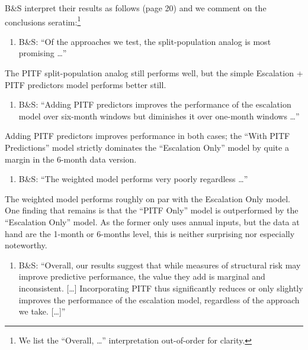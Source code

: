 \documentclass[
]{article}
\providecommand{\tightlist}{%
  \setlength{\itemsep}{0pt}\setlength{\parskip}{0pt}}
\begin{document}
B\&S interpret their results as follows (page 20) and we comment on the conclusions seratim:\footnote{We list the ``Overall, \ldots{}'' interpretation out-of-order for clarity.}

\begin{enumerate}
\def\labelenumi{\arabic{enumi}.}
\tightlist
\item
  B\&S: ``Of the approaches we test, the split-population analog is most promising \ldots{}''
\end{enumerate}

The PITF split-population analog still performs well, but the simple Escalation + PITF predictors model performs better still.

\begin{enumerate}
\def\labelenumi{\arabic{enumi}.}
\setcounter{enumi}{1}
\tightlist
\item
  B\&S: ``Adding PITF predictors improves the performance of the escalation model over six-month windows but diminishes it over one-month windows \ldots ''
\end{enumerate}

Adding PITF predictors improves performance in both cases; the ``With PITF Predictions'' model strictly dominates the ``Escalation Only'' model by quite a margin in the 6-month data version.

\begin{enumerate}
\def\labelenumi{\arabic{enumi}.}
\setcounter{enumi}{2}
\tightlist
\item
  B\&S: ``The weighted model performs very poorly regardless \ldots ''
\end{enumerate}

The weighted model performs roughly on par with the Escalation Only model. One finding that remains is that the ``PITF Only'' model is outperformed by the ``Escalation Only'' model. As the former only uses annual inputs, but the data at hand are the 1-month or 6-months level, this is neither surprising nor especially noteworthy.

\begin{enumerate}
\def\labelenumi{\arabic{enumi}.}
\setcounter{enumi}{3}
\tightlist
\item
  B\&S: ``Overall, our results suggest that while measures of structural risk may improve predictive performance, the value they add is marginal and inconsistent. {[}\ldots{]} Incorporating PITF thus significantly reduces or only slightly improves the performance of the escalation model, regardless of the approach we take. {[}\ldots{]}''
\end{enumerate}
\end{document}
